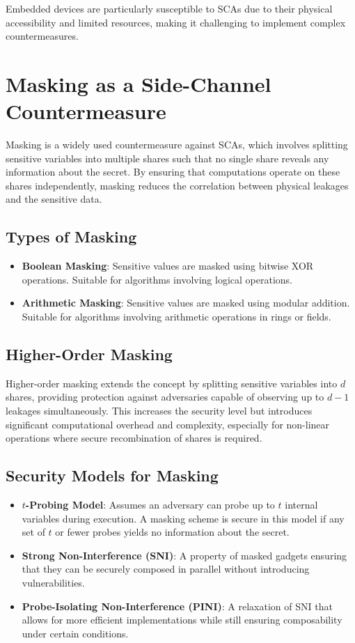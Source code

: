 Embedded devices are particularly susceptible to \acp{SCA} due to their physical accessibility and limited resources, making it challenging to implement complex countermeasures.

\section{Masking as a Side-Channel Countermeasure}

Masking is a widely used countermeasure against \acp{SCA}, which involves splitting sensitive variables into multiple shares such that no single share reveals any information about the secret. By ensuring that computations operate on these shares independently, masking reduces the correlation between physical leakages and the sensitive data.

\subsection{Types of Masking}

\begin{itemize}
    \item \textbf{Boolean Masking}: Sensitive values are masked using bitwise XOR operations. Suitable for algorithms involving logical operations.
    \item \textbf{Arithmetic Masking}: Sensitive values are masked using modular addition. Suitable for algorithms involving arithmetic operations in rings or fields.
\end{itemize}

\subsection{Higher-Order Masking}

Higher-order masking extends the concept by splitting sensitive variables into $d$ shares, providing protection against adversaries capable of observing up to $d - 1$ leakages simultaneously. This increases the security level but introduces significant computational overhead and complexity, especially for non-linear operations where secure recombination of shares is required.

\subsection{Security Models for Masking}

\begin{itemize}
    \item \textbf{$t$-Probing Model}: Assumes an adversary can probe up to $t$ internal variables during execution. A masking scheme is secure in this model if any set of $t$ or fewer probes yields no information about the secret.
    \item \textbf{Strong Non-Interference (SNI)}: A property of masked gadgets ensuring that they can be securely composed in parallel without introducing vulnerabilities.
    \item \textbf{Probe-Isolating Non-Interference (PINI)}: A relaxation of SNI that allows for more efficient implementations while still ensuring composability under certain conditions.
\end{itemize}

